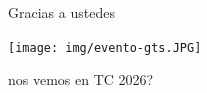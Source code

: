 \documentclass{beamer}
\begin{document}
\begin{frame}{Gracias a ustedes}
    \begin{center}
        \texttt{[image: img/evento-gts.JPG]}

        \vspace{0.5cm}
        nos vemos en TC 2026?
    \end{center}
\end{frame}
\end{document}

